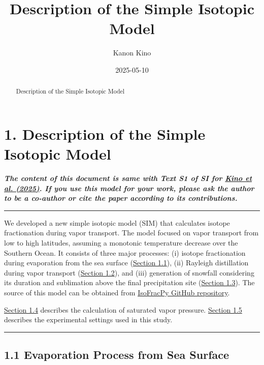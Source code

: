 \documentclass[11pt]{article}
\title{Description of the Simple Isotopic Model}
\author{Kanon Kino}
\date{2025-05-10}
\begin{document}
\maketitle

\begin{abstract}
\noindent Description of the Simple Isotopic Model
\end{abstract}


\section{1. Description of the Simple Isotopic
Model}\label{description-of-the-simple-isotopic-model}

\textbf{\emph{The content of this document is same with Text S1 of SI for \href{https://doi.org/10.3178/hrl.24-00034}{Kino et al. (2025)}. If you use this model for your work, please ask the author to be a co-author or cite the paper according to its contributions.}}

\begin{center}\rule{0.5\linewidth}{0.5pt}\end{center}

We developed a new simple isotopic model (SIM) that calculates isotope fractionation during vapor
transport. The model focused on vapor transport from low to high latitudes, assuming a monotonic
temperature decrease over the Southern Ocean. It consists of three major processes: (i) isotope
fractionation during evaporation from the sea surface
(\hyperref[1.1-Evaporation-Process-from-Sea-Surface]{Section 1.1}), (ii) Rayleigh distillation
during vapor transport (\hyperref[1.2-Vapor-Transport-Process]{Section 1.2}), and (iii) generation
of snowfall considering its duration and sublimation above the final precipitation site
(\hyperref[1.3-Processes-at-the-Final-Site]{Section 1.3}). The source of this model can be obtained
from \href{https://github.com/kanonundgigue/IsoFracPy}{IsoFracPy GitHub repository}.

\hyperref[1.4-Calculation-of-Saturation-Vapor-Pressure]{Section 1.4} describes the calculation of
saturated vapor pressure. \hyperref[1.5-Experimental-settings]{Section 1.5} describes the
experimental settings used in this study.

\begin{center}\rule{0.5\linewidth}{0.5pt}\end{center}

\subsection{1.1 Evaporation Process from Sea Surface}\label{evaporation-process-from-sea-surface}
\end{document}
